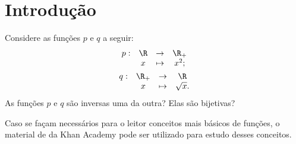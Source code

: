 \section{Introdução}

Considere as funções $p$ e $q$ a seguir:
%
\begin{gather*}
\begin{array}{cccc}
p : & \R & \to     & \R_+ \\
     &  x & \mapsto & x^2;
\end{array}\\
\begin{array}{cccc}
q : & \R_+ & \to     & \R \\
     &  x & \mapsto & \sqrt x.
\end{array}
\end{gather*}
As funções $p$ e $q$ são inversas uma da outra?  Elas são bijetivas?

\begin{remark}
Caso se façam necessários para o leitor conceitos mais básicos de funções, o material de  da Khan Academy pode ser utilizado para estudo desses conceitos.
\end{remark}